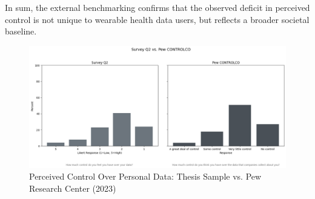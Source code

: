 		In sum, the external benchmarking confirms that the observed deficit in perceived control is not unique to wearable health data users, but reflects a broader societal baseline. 		
	\begin{figure}[ht]\centering
		\includegraphics[width=1\linewidth]{figures/img/Pew_comparison_plots/compare_2_vs_CONTROLCO.png}
		\caption{Perceived Control Over Personal Data: Thesis Sample vs. Pew Research Center (2023)}
		\label{fig:Pew_control_comparison}
	\end{figure}
